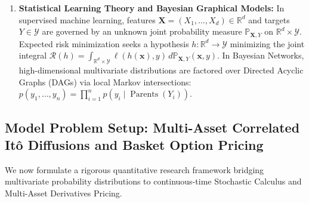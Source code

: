 \documentclass[11pt, letterpaper]{article}
\theoremstyle{definition}
\theoremstyle{remark}
\newcommand{\R}{\mathbb{R}}
\newcommand{\Prob}{\mathbb{P}}
\begin{document}
\begin{enumerate}[label=\textbf{Scenario \arabic*:}]
    \item \textbf{Statistical Learning Theory and Bayesian Graphical Models:}
    In supervised machine learning, features $\mathbf{X} = (X_1, \dots, X_d) \in \R^d$ and targets $Y \in \mathcal{Y}$ are governed by an unknown joint probability measure $\Prob_{\mathbf{X}, Y}$ on $\R^d \times \mathcal{Y}$. Expected risk minimization seeks a hypothesis $h : \R^d \to \mathcal{Y}$ minimizing the joint integral $\mathcal{R}(h) = \int_{\R^d \times \mathcal{Y}} \ell(h(\mathbf{x}), y)\, d\Prob_{\mathbf{X}, Y}(\mathbf{x}, y)$. In Bayesian Networks, high-dimensional multivariate distributions are factored over Directed Acyclic Graphs (DAGs) via local Markov intersections: $p(y_1, \dots, y_n) = \prod_{i=1}^n p(y_i \mid \operatorname{Parents}(Y_i))$.
\end{enumerate}

\subsection{Model Problem Setup: Multi-Asset Correlated It\^{o} Diffusions and Basket Option Pricing}

We now formulate a rigorous quantitative research framework bridging multivariate probability distributions to continuous-time Stochastic Calculus and Multi-Asset Derivatives Pricing.
\end{document}
